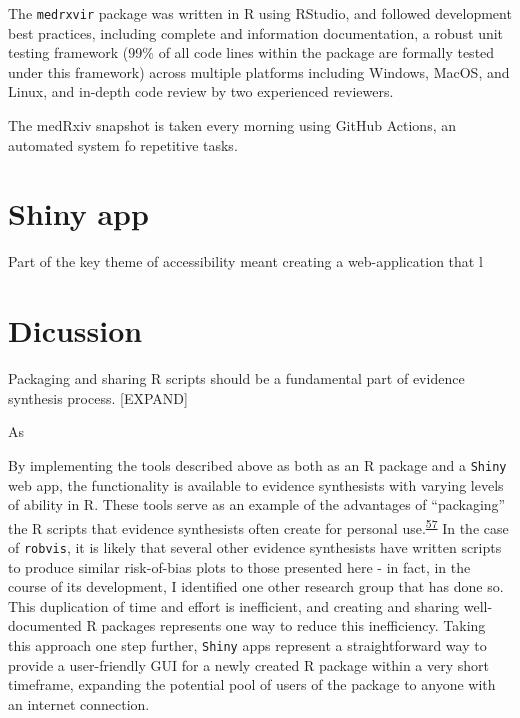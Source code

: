 \documentclass[a4paper, twoside]{templates/ociamthesis}
\begin{document}
The \texttt{medrxvir} package was written in R using RStudio, and followed development best practices, including complete and information documentation, a robust unit testing framework (99\% of all code lines within the package are formally tested under this framework) across multiple platforms including Windows, MacOS, and Linux, and in-depth code review by two experienced reviewers.

The medRxiv snapshot is taken every morning using GitHub Actions, an automated system fo repetitive tasks.

\hypertarget{shiny-app}{%
\section{Shiny app}\label{shiny-app}}

Part of the key theme of accessibility meant creating a web-application that l

\hypertarget{dicussion}{%
\section{Dicussion}\label{dicussion}}

Packaging and sharing R scripts should be a fundamental part of evidence synthesis process. {[}EXPAND{]}

As

By implementing the tools described above as both as an R package and a \texttt{Shiny} web app, the functionality is available to evidence synthesists with varying levels of ability in R. These tools serve as an example of the advantages of ``packaging'' the R scripts that evidence synthesists often create for personal use.\textsuperscript{\protect\hyperlink{ref-wickham2015r}{57}} In the case of \texttt{robvis}, it is likely that several other evidence synthesists have written scripts to produce similar risk-of-bias plots to those presented here - in fact, in the course of its development, I identified one other research group that has done so. This duplication of time and effort is inefficient, and creating and sharing well-documented R packages represents one way to reduce this inefficiency. Taking this approach one step further, \texttt{Shiny} apps represent a straightforward way to provide a user-friendly GUI for a newly created R package within a very short timeframe, expanding the potential pool of users of the package to anyone with an internet connection.
\end{document}

